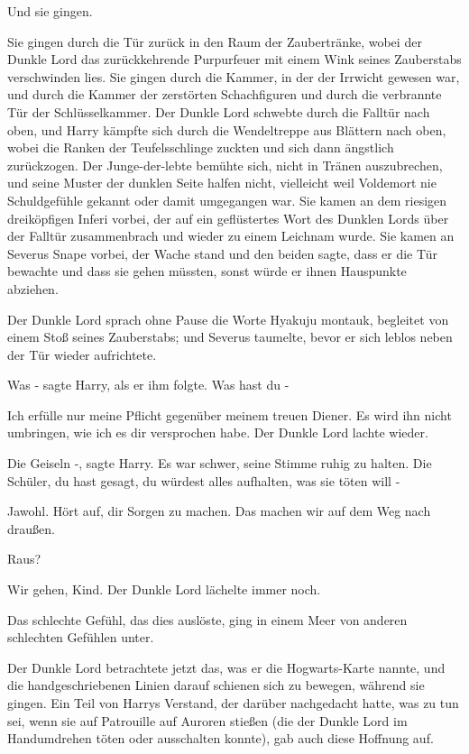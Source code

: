 Und sie gingen.

Sie gingen durch die Tür zurück in den Raum der Zaubertränke, wobei der Dunkle
Lord das zurückkehrende Purpurfeuer mit einem Wink seines Zauberstabs
verschwinden lies. Sie gingen durch die Kammer, in der der Irrwicht gewesen war,
und durch die Kammer der zerstörten Schachfiguren und durch die verbrannte Tür
der Schlüsselkammer. Der Dunkle Lord schwebte durch die Falltür nach oben, und
Harry kämpfte sich durch die Wendeltreppe aus Blättern nach oben, wobei die
Ranken der Teufelsschlinge zuckten und sich dann ängstlich zurückzogen. Der
Junge-der-lebte bemühte sich, nicht in Tränen auszubrechen, und seine Muster der
dunklen Seite halfen nicht, vielleicht weil Voldemort nie Schuldgefühle gekannt
oder damit umgegangen war. Sie kamen an dem riesigen dreiköpfigen Inferi vorbei,
der auf ein geflüstertes Wort des Dunklen Lords über der Falltür zusammenbrach
und wieder zu einem Leichnam wurde. Sie kamen an Severus Snape vorbei, der Wache
stand und den beiden sagte, dass er die Tür bewachte und dass sie gehen müssten,
sonst würde er ihnen Hauspunkte abziehen.

Der Dunkle Lord sprach ohne Pause die Worte \glqq{}Hyakuju montauk\grqq{},
begleitet von einem Stoß seines Zauberstabs; und Severus taumelte, bevor er sich
leblos neben der Tür wieder aufrichtete.

\glqq{}Was -\grqq{} sagte Harry, als er ihm folgte. \glqq{}Was hast du -\grqq{}

\glqq{}Ich erfülle nur meine Pflicht gegenüber meinem treuen Diener. Es wird ihn
nicht umbringen, wie ich es dir versprochen habe.\grqq{} Der Dunkle Lord lachte
wieder.

\glqq{}Die Geiseln -\grqq{}, sagte Harry. Es war schwer, seine Stimme ruhig zu
halten. \glqq{}Die Schüler, du hast gesagt, du würdest alles aufhalten, was sie
töten will -\grqq{}

\glqq{}Jawohl. Hört auf, dir Sorgen zu machen. Das machen wir auf dem Weg nach
draußen.\grqq{}

\glqq{}Raus?\grqq{}

\glqq{}Wir gehen, Kind.\grqq{} Der Dunkle Lord lächelte immer noch.

Das schlechte Gefühl, das dies auslöste, ging in einem Meer von anderen
schlechten Gefühlen unter.

Der Dunkle Lord betrachtete jetzt das, was er die Hogwarts-Karte nannte, und die
handgeschriebenen Linien darauf schienen sich zu bewegen, während sie gingen.
Ein Teil von Harrys Verstand, der darüber nachgedacht hatte, was zu tun sei,
wenn sie auf Patrouille auf Auroren stießen (die der Dunkle Lord im Handumdrehen
töten oder ausschalten konnte), gab auch diese Hoffnung auf.

